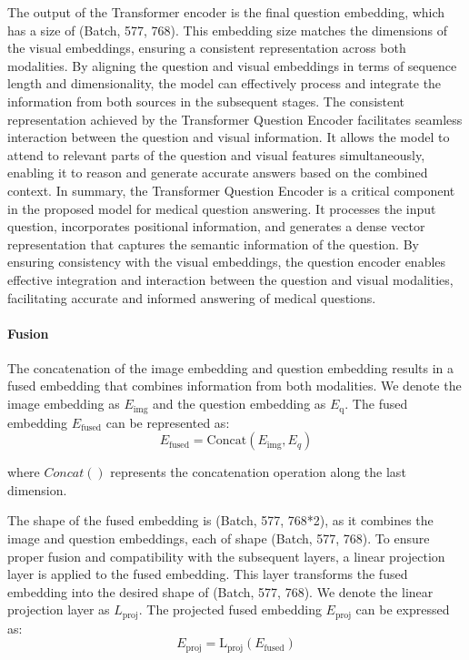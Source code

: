 \documentclass[pdflatex,sn-mathphys-num]{sn-jnl}%
\begin{document}
The output of the Transformer encoder is the final question embedding, which has a size of (Batch, 577, 768). This embedding size matches the dimensions of the visual embeddings, ensuring a consistent representation across both modalities. By aligning the question and visual embeddings in terms of sequence length and dimensionality, the model can effectively process and integrate the information from both sources in the subsequent stages.
The consistent representation achieved by the Transformer Question Encoder facilitates seamless interaction between the question and visual information. It allows the model to attend to relevant parts of the question and visual features simultaneously, enabling it to reason and generate accurate answers based on the combined context.
In summary, the Transformer Question Encoder is a critical component in the proposed model for medical question answering. It processes the input question, incorporates positional information, and generates a dense vector representation that captures the semantic information of the question. By ensuring consistency with the visual embeddings, the question encoder enables effective integration and interaction between the question and visual modalities, facilitating accurate and informed answering of medical questions.


\paragraph{Fusion}
The concatenation of the image embedding and question embedding results in a fused embedding that combines information from both modalities. We denote the image embedding as $E_{\mathrm{img}}$ and the question embedding as $E_{\mathrm{q}}$. The fused embedding $E_{\mathrm{fused}}$ can be represented as:
\begin{equation}
    E_{\mathrm{fused}}=\mathrm{Concat}\left(E_{\mathrm{img}},E_q\right)
\end{equation}

where $Concat()$ represents the concatenation operation along the last dimension.

The shape of the fused embedding is (Batch, 577, 768*2), as it combines the image and question embeddings, each of shape (Batch, 577, 768).
To ensure proper fusion and compatibility with the subsequent layers, a linear projection layer is applied to the fused embedding. This layer transforms the fused embedding into the desired shape of (Batch, 577, 768). We denote the linear projection layer as $L_{\mathrm{proj}}$. The projected fused embedding $E_{\mathrm{proj}}$ can be expressed as:
\begin{equation}
E_{\mathrm{proj}}=\mathrm{L}_{\mathrm{proj}}\left(E_{\mathrm{fused}}\right)
\end{equation}
\end{document}
